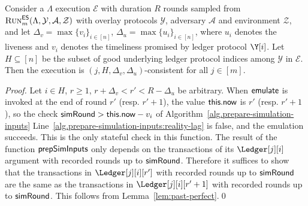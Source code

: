 \begin{lemma}\label{lem:consistency}
  Consider a \rollerblade $\Lambda$ execution $\mathcal{E}$ with duration $R$ rounds
  sampled from $\textsc{Run}^{\textsf{ES}}_m(\Lambda, \mathcal{Y}, \mathcal{A}, \mathcal{Z})$
  with overlay protocols $\mathcal{Y}$, adversary $\mathcal{A}$ and environment $\mathcal{Z}$,
  and let $\Delta_v = \max\{v_i\}_{i \in [n]}$,
          $\Delta_u = \max\{u_i\}_{i \in [n]}$,
  where $u_i$ denotes the liveness
  and $v_i$ denotes the timeliness
  promised by ledger protocol $\Y[i]$.
  Let $H \subseteq [n]$ be the subset of good underlying ledger protocol indices among $\mathcal{Y}$
  in $\mathcal{E}$.
  Then the execution is $(j, H, \Delta_v, \Delta_u)$-consistent for all $j \in [m]$.
\end{lemma}
\begin{proof}
  Let $i \in H$, $r \geq 1$, $r + \Delta_v < r' < R - \Delta_u$ be arbitrary.
  When $\textsf{emulate}$ is invoked at the end of round $r'$ (resp. $r' + 1$),
  the value $\textsf{this}.\textsf{now}$
  is $r'$ (resp. $r' + 1$), so the check $\textsf{simRound} > \textsf{this}.\textsf{now} - v_i$ of Algorithm~\ref{alg.prepare-simulation-inputs}
  Line~\ref{alg.prepare-simulation-inputs:reality-lag} is false, and the emulation
  succeeds. This is the only stateful check in this function.
  The result of the function $\textsf{prepSimInputs}$ only depends on the transactions of
  its $\Ledger[j][i]$ argument with recorded rounds up to $\textsf{simRound}$.
  Therefore it suffices to show that the transactions in
  $\Ledger[j][i][r']$ with recorded rounds up to $\textsf{simRound}$ are the same
  as the transactions in $\Ledger[j][i][r' + 1]$ with recorded rounds up to $\textsf{simRound}$.
  This follows from Lemma~\ref{lem:past-perfect}.\qed
\end{proof}


